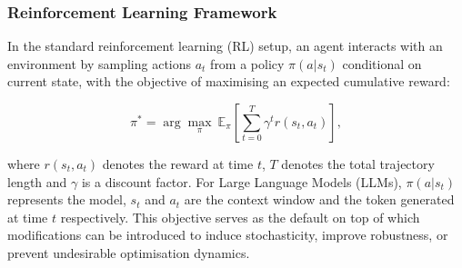 

 


\subsubsection{Reinforcement Learning Framework}
In the standard reinforcement learning (RL) setup, an agent interacts with an environment by sampling actions $a_t$ from a policy $\pi(a|s_t)$ conditional on current state, with the objective of maximising an expected cumulative reward:

\begin{equation}
    \pi^* = \arg \underset{\pi}{\max}\ \mathbb{E}_\pi
    \left[\sum^T_{t=0}\gamma^t r(s_t, a_t)\right],
\end{equation}

where $r(s_t, a_t)$ denotes the reward at time $t$, $T$ denotes the total trajectory length and $\gamma$ is a discount factor. For Large Language Models (LLMs), $\pi(a|s_t)$ represents the model, $s_t$ and $a_t$ are the context window and the token generated at time $t$ respectively. This objective serves as the default on top of which modifications can be introduced to induce stochasticity, improve robustness, or prevent undesirable optimisation dynamics.

